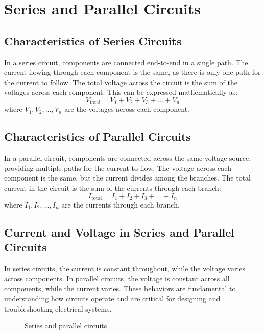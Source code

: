 \section{Series and Parallel Circuits}
\label{section:series_and_parallel_circuits}

\subsection*{Characteristics of Series Circuits}
In a series circuit, components are connected end-to-end in a single path. The current flowing through each component is the same, as there is only one path for the current to follow. The total voltage across the circuit is the sum of the voltages across each component. This can be expressed mathematically as:
\begin{equation}
    V_{\text{total}} = V_1 + V_2 + V_3 + \dots + V_n
    \label{eq:series_voltage}
\end{equation}
where \( V_1, V_2, \dots, V_n \) are the voltages across each component.

\subsection*{Characteristics of Parallel Circuits}
In a parallel circuit, components are connected across the same voltage source, providing multiple paths for the current to flow. The voltage across each component is the same, but the current divides among the branches. The total current in the circuit is the sum of the currents through each branch:
\begin{equation}
    I_{\text{total}} = I_1 + I_2 + I_3 + \dots + I_n
    \label{eq:parallel_current}
\end{equation}
where \( I_1, I_2, \dots, I_n \) are the currents through each branch.

\subsection*{Current and Voltage in Series and Parallel Circuits}
In series circuits, the current is constant throughout, while the voltage varies across components. In parallel circuits, the voltage is constant across all components, while the current varies. These behaviors are fundamental to understanding how circuits operate and are critical for designing and troubleshooting electrical systems.

\begin{figure}[h]
    \centering
    \caption{Series and parallel circuits}
    \label{fig:series_parallel}
\end{figure}

